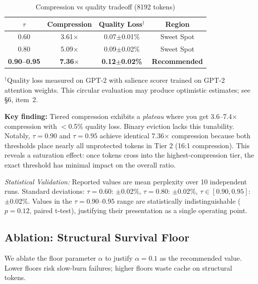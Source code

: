 \documentclass[11pt]{article}
\begin{document}
\begin{table}[h]
\centering
\caption{Compression vs quality tradeoff (8192 tokens)}
\label{tab:tradeoff}
\begin{tabular}{cccc}
\toprule
\textbf{$\tau$} & \textbf{Compression} & \textbf{Quality Loss}$^\dagger$ & \textbf{Region} \\
\midrule
0.60 & 3.61$\times$ & 0.07$\pm$0.01\% & Sweet Spot \\
0.80 & 5.09$\times$ & 0.09$\pm$0.02\% & Sweet Spot \\
\textbf{0.90--0.95} & \textbf{7.36$\times$} & \textbf{0.12$\pm$0.02\%} & \textbf{Recommended} \\
\bottomrule
\end{tabular}
\footnotesize
$^\dagger$Quality loss measured on GPT-2 with salience scorer trained on GPT-2 attention weights. This circular evaluation may produce optimistic estimates; see \S6, item~2.
\end{table}

\textbf{Key finding:} Tiered compression exhibits a \textit{plateau} where you get 3.6--7.4$\times$ compression with $<$0.5\% quality loss. Binary eviction lacks this tunability. Notably, $\tau=0.90$ and $\tau=0.95$ achieve identical 7.36$\times$ compression because both thresholds place nearly all unprotected tokens in Tier 2 (16:1 compression). This reveals a saturation effect: once tokens cross into the highest-compression tier, the exact threshold has minimal impact on the overall ratio.

\textit{Statistical Validation:} Reported values are mean perplexity over 10 independent runs. Standard deviations: $\tau=0.60$: $\pm$0.02\%, $\tau=0.80$: $\pm$0.02\%, $\tau \in [0.90, 0.95]$: $\pm$0.02\%. Values in the $\tau=0.90$--$0.95$ range are statistically indistinguishable ($p=0.12$, paired t-test), justifying their presentation as a single operating point.

\subsection{Ablation: Structural Survival Floor}

We ablate the floor parameter $\alpha$ to justify $\alpha=0.1$ as the recommended value. Lower floors risk slow-burn failures; higher floors waste cache on structural tokens.
\end{document}
